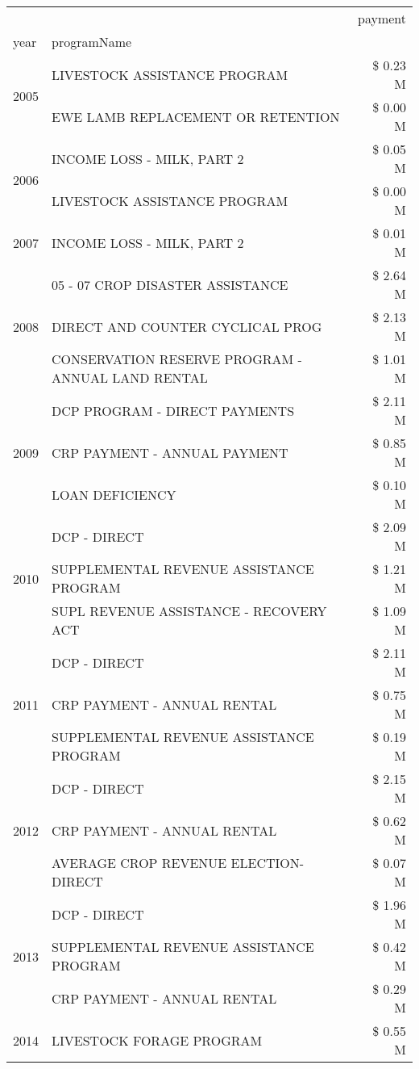\begin{tabular}{llr}
\toprule
 &  & payment \\
year & programName &  \\
\midrule
\multirow[t]{2}{*}{2005} & LIVESTOCK ASSISTANCE PROGRAM & \$ 0.23 M \\
 & EWE LAMB REPLACEMENT OR RETENTION & \$ 0.00 M \\
\cline{1-3}
\multirow[t]{2}{*}{2006} & INCOME LOSS - MILK, PART 2 & \$ 0.05 M \\
 & LIVESTOCK ASSISTANCE PROGRAM & \$ 0.00 M \\
\cline{1-3}
2007 & INCOME LOSS - MILK, PART 2 & \$ 0.01 M \\
\cline{1-3}
\multirow[t]{3}{*}{2008} & 05 - 07 CROP DISASTER ASSISTANCE & \$ 2.64 M \\
 & DIRECT AND COUNTER CYCLICAL PROG & \$ 2.13 M \\
 & CONSERVATION RESERVE PROGRAM - ANNUAL LAND RENTAL & \$ 1.01 M \\
\cline{1-3}
\multirow[t]{3}{*}{2009} & DCP PROGRAM - DIRECT PAYMENTS & \$ 2.11 M \\
 & CRP PAYMENT - ANNUAL PAYMENT & \$ 0.85 M \\
 & LOAN DEFICIENCY & \$ 0.10 M \\
\cline{1-3}
\multirow[t]{3}{*}{2010} & DCP - DIRECT & \$ 2.09 M \\
 & SUPPLEMENTAL REVENUE ASSISTANCE PROGRAM & \$ 1.21 M \\
 & SUPL REVENUE ASSISTANCE - RECOVERY ACT & \$ 1.09 M \\
\cline{1-3}
\multirow[t]{3}{*}{2011} & DCP - DIRECT & \$ 2.11 M \\
 & CRP PAYMENT - ANNUAL RENTAL & \$ 0.75 M \\
 & SUPPLEMENTAL REVENUE ASSISTANCE PROGRAM & \$ 0.19 M \\
\cline{1-3}
\multirow[t]{3}{*}{2012} & DCP - DIRECT & \$ 2.15 M \\
 & CRP PAYMENT - ANNUAL RENTAL & \$ 0.62 M \\
 & AVERAGE CROP REVENUE ELECTION-DIRECT & \$ 0.07 M \\
\cline{1-3}
\multirow[t]{3}{*}{2013} & DCP - DIRECT & \$ 1.96 M \\
 & SUPPLEMENTAL REVENUE ASSISTANCE PROGRAM & \$ 0.42 M \\
 & CRP PAYMENT - ANNUAL RENTAL & \$ 0.29 M \\
\cline{1-3}
\multirow[t]{3}{*}{2014} & LIVESTOCK FORAGE PROGRAM & \$ 0.55 M \\

\end{tabular}
